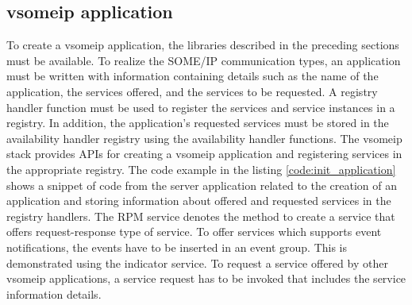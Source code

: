 \subsection{vsomeip application}
To create a vsomeip application, the libraries described in the preceding sections must be available. To realize the SOME/IP communication types, an application must be written with information containing details such as the name of the application, the services offered, and the services to be requested. A registry handler function must be used to register the services and service instances in a registry. In addition, the application's requested services must be stored in the availability handler registry using the availability handler functions. The vsomeip stack provides APIs for creating a vsomeip application and registering services in the appropriate registry. The code example in the listing \ref{code:init_application} shows a snippet of code from the server application related to the creation of an application and storing information about offered and requested services in the registry handlers. The RPM service denotes the method to create a service that offers request-response type of service. To offer services which supports event notifications, the events have to be inserted in an event group. This is demonstrated using the indicator service. To request a service offered by other vsomeip applications, a service request has to be invoked that includes the service information details. 

